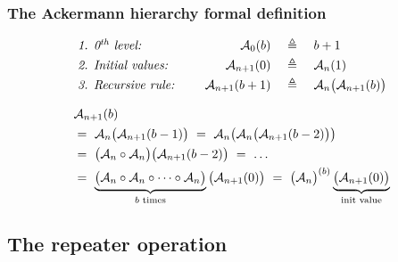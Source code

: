 \begin{frame}
\frametitle{The Ackermann hierarchy formal definition}
\begin{equation*}
\begin{array}{lrcl}
\textit{1. 0$^{\textit{th}}$ level: } & \mathcal{A}_0(b) & ~ \triangleq ~ & b + 1 \\[3pt]
\textit{2. Initial values: } & \mathcal{A}_{n+1}(0) & ~ \triangleq ~ & \mathcal{A}_n(1) \\[3pt]
\textit{3. Recursive rule: } \quad & \mathcal{A}_{n+1}(b+1) & ~ \triangleq ~ & \mathcal{A}_n\big(\mathcal{A}_{n+1}(b)\big)
\end{array}
\end{equation*}

\bigskip

\begin{equation*}
\begin{aligned}
& \mathcal{A}_{n+1}(b) \\
& = ~ \mathcal{A}_n\big(\mathcal{A}_{n+1}(b-1)\big) ~ = ~ \mathcal{A}_n\big(\mathcal{A}_n\big(\mathcal{A}_{n+1}(b-2)\big)\big) \\
& = ~ \big(\mathcal{A}_n\circ \mathcal{A}_n\big) \big(\mathcal{A}_{n+1}(b-2)\big) ~ = ~ \ldots \\
& = ~ \underbrace{\big( \mathcal{A}_n\circ \mathcal{A}_n\circ \cdots \circ \mathcal{A}_n \big)}_{b \text{ times}} \big(\mathcal{A}_{n+1}(0)\big)  ~ = ~ \big(\mathcal{A}_n\big)^{(b)}\underbrace{\big(\mathcal{A}_{n+1}(0)\big)}_{\text{init value}}
\end{aligned}
\end{equation*}

\end{frame}


\subsection{The repeater operation}


